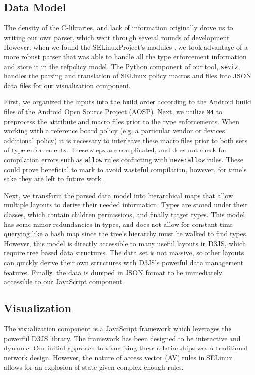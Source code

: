 \documentclass[conference]{IEEEtran}
\begin{document}
\subsection{Data Model}\label{sec:datamodel}
The density of the C-libraries, and lack of information originally drove us to writing our own parser, which went through several rounds of development. However, when we found the SELinuxProject's modules \cite{selinuxproject}, we took advantage of a more robust parser that was able to handle all the type enforcement information and store it in the refpolicy model. The Python component of our tool, \texttt{seviz},  handles the parsing and translation of SELinux policy macros and files into JSON data files for our visualization component.

First, we organized the inputs into the build order according to the Android build files of the Android Open Source Project (AOSP)\cite{designandroid}. Next, we utilize \texttt{M4} \cite{m4} to preprocess the attribute and macro files prior to the type enforcements. When working with a reference board policy (e.g. a particular vendor or devices additional policy) it is necessary to interleave these macro files prior to both sets of type enforcements. These steps are complicated, and does not check for compilation errors such as \texttt{allow} rules conflicting with \texttt{neverallow} rules. These could prove beneficial to mark to avoid wasteful compilation, however, for time's sake they are left to future work.

Next, we transform the parsed data model into hierarchical maps that allow multiple layouts to derive their needed information. Types are stored under their classes, which contain children permissions, and finally target types. This model has some minor redundancies in types, and does not allow for constant-time querying like a hash map since the tree's hierarchy must be walked to find types. However, this model is directly accessible to many useful layouts in D3JS, which require tree based data structures. The data set is not massive, so other layouts can quickly derive their own structures with D3JS's powerful data management features. Finally, the data is dumped in JSON format to be immediately accessible to our JavaScript component.

\subsection{Visualization}\label{sec:viz}
The visualization component is a JavaScript framework which leverages the powerful D3JS library\cite{bostock2012d3}. The framework has been designed to be interactive and dynamic. Our initial approach to visualizing these relationships was a traditional network design. However, the nature of access vector (AV) rules in SELinux allows for an explosion of state given complex enough rules\cite{AVCRules}.
\end{document}
